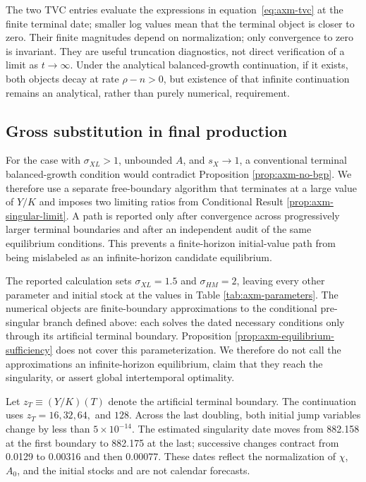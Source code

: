 The two TVC entries evaluate the expressions in equation~\eqref{eq:axm-tvc} at
the finite terminal date; smaller log values mean that the terminal object is
closer to zero. Their finite magnitudes depend on normalization; only convergence
to zero is invariant. They are useful truncation diagnostics, not direct verification
of a limit as \(t\to\infty\). Under the analytical balanced-growth continuation,
if it exists, both objects decay at rate \(\rho-n>0\), but existence of that infinite
continuation remains an analytical, rather than purely numerical, requirement.

\subsection{Gross substitution in final production}

For the case with \(\sigma_{XL}>1\), unbounded \(A\), and \(s_X\to1\), a
conventional terminal balanced-growth condition would contradict Proposition
\ref{prop:axm-no-bgp}. We therefore use a separate
free-boundary algorithm that terminates at a large value of \(Y/K\) and imposes
two limiting ratios from Conditional Result \ref{prop:axm-singular-limit}. A path is
reported only after convergence across progressively larger terminal boundaries
and after an independent audit of the same equilibrium conditions. This prevents a
finite-horizon initial-value path from being mislabeled as an infinite-horizon
candidate equilibrium.

The reported calculation sets \(\sigma_{XL}=1.5\) and
\(\sigma_{HM}=2\), leaving every other parameter and initial stock at the values
in Table \ref{tab:axm-parameters}. The numerical objects are finite-boundary
approximations to the conditional pre-singular branch defined above: each solves
the dated necessary conditions only through its artificial terminal boundary.
Proposition \ref{prop:axm-equilibrium-sufficiency} does not cover this
parameterization. We therefore do not call the approximations an infinite-horizon
equilibrium, claim that they reach the singularity, or assert global
intertemporal optimality.

Let \(z_T\equiv(Y/K)(T)\) denote the artificial terminal boundary. The
continuation uses \(z_T=16,32,64,\) and \(128\).
Across the last doubling, both initial jump variables change by less than
\(5\times10^{-14}\). The estimated singularity date moves from 882.158 at the
first boundary to 882.175 at the last; successive changes contract from 0.0129
to 0.00316 and then 0.00077. These dates reflect the normalization of
\(\chi\), \(A_0\), and the initial stocks and are not calendar forecasts.

